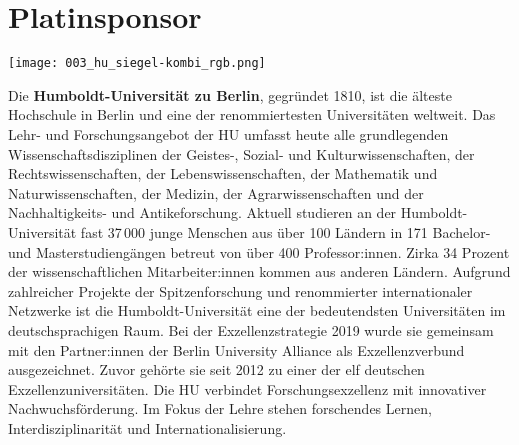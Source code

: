 \section*{Platinsponsor}
\begin{flushright}
  \texttt{[image: 003\_hu\_siegel-kombi\_rgb.png]}
\end{flushright}
\noindent
Die {\bfseries Humboldt-Universität zu Berlin}, gegründet 1810, ist die älteste Hochschule in Berlin
und eine der renommiertesten Universitäten weltweit. Das Lehr- und Forschungsangebot der HU umfasst heute alle grundlegenden
Wissenschaftsdisziplinen der Geistes-, Sozial- und Kulturwissenschaften, der Rechtswissenschaften, der Lebenswissenschaften, der Mathematik und Naturwissenschaften, der Medizin, der Agrarwissenschaften und der Nachhaltigkeits- und Antikeforschung. Aktuell studieren an der Humboldt-Universität fast 37\,000 junge Menschen aus über 100 Ländern in 171 Bachelor- und Masterstudiengängen betreut von über 400 Professor:innen. Zirka 34 Prozent der wissenschaftlichen Mitarbeiter:innen kommen aus anderen Ländern. Aufgrund zahlreicher Projekte der Spitzenforschung und renommierter internationaler Netzwerke ist die Humboldt-Universität eine der bedeutendsten Universitäten im deutschsprachigen Raum. Bei der Exzellenzstrategie 2019 wurde sie gemeinsam mit den Partner:innen der Berlin University Alliance als Exzellenzverbund ausgezeichnet. Zuvor gehörte sie seit 2012 zu einer der elf deutschen Exzellenzuniversitäten. Die HU verbindet Forschungsexzellenz mit innovativer Nachwuchsförderung. Im Fokus der Lehre stehen forschendes Lernen, Interdisziplinarität und Internationalisierung.
